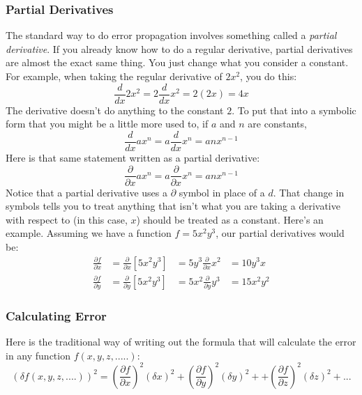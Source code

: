 \documentclass[twoside,11pt,ShortChapTitles]{BYUTextbook}
\begin{document}
\subsubsection{Partial Derivatives}
The standard way to do error propagation involves something called a {\em partial derivative}.  If you already know how to do a regular derivative, partial derivatives are almost the exact same thing.  You just change what you consider a constant.  For example,  when taking the regular derivative of $2x^2$, you do this:
\[\frac{d}{dx}2x^2 = 2\frac{d}{dx}x^2 = 2\left(2x\right) = 4x\]
The derivative doesn't do anything to the constant $2$.  To put that into a symbolic form that you might be a little more used to, if $a$ and $n$ are constants,
\[\frac{d}{dx} ax^n = a\frac{d}{dx}x^n = anx^{n-1}\]
Here is that same statement written as a partial derivative:
\[\frac{\partial}{\partial x} ax^n = a\frac{\partial}{\partial x}x^n = anx^{n-1}
\]
 Notice that a partial derivative uses a $\partial$ symbol in place of a $d$. That change in symbols tells you to treat anything that isn't what you are taking a derivative with respect to (in this case, $x$) should be treated as a constant.  Here's an example.  Assuming we have a function $f=5x^2y^3$, our partial derivatives would be:
 \[\begin{aligned}
 \frac{\partial f}{\partial x} &= \frac{\partial}{\partial x}\left[5x^2y^3\right] & = 5y^3\frac{\partial}{\partial x}x^2 &= 10y^3x \\
  \frac{\partial f}{\partial y} &= \frac{\partial}{\partial y}\left[5x^2y^3\right] & = 5x^2\frac{\partial}{\partial y}y^3 &= 15x^2y^2
 \end{aligned}\]
 
 \subsubsection{Calculating Error}
 Here is the traditional way of writing out the formula that will calculate the error in any function $f(x,y,z,.....)$:
 \[
 \left(\delta f(x,y,z,....)\right)^2 = \left(\frac{\partial f}{\partial x}\right)^2(\delta x)^2+ \left(\frac{\partial f}{\partial y}\right)^2(\delta y)^2++ \left(\frac{\partial f}{\partial z}\right)^2(\delta z)^2+...
 \]
 
\end{document}
